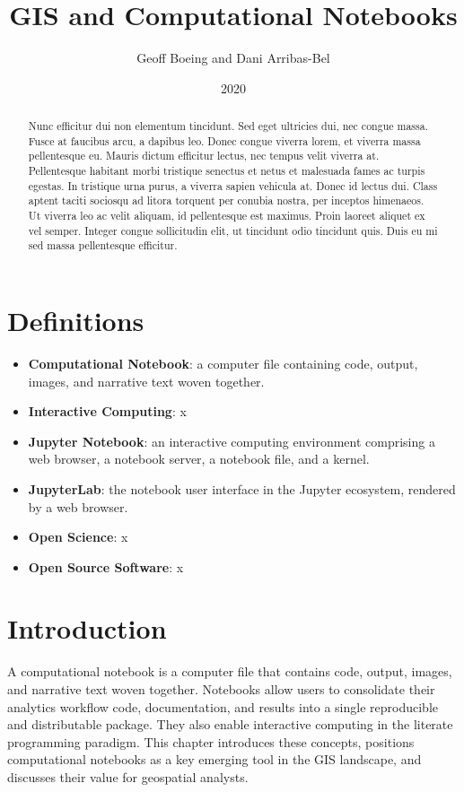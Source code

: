 \documentclass[11pt,letterpaper]{article}
\title{GIS and Computational Notebooks}
\author{Geoff Boeing and Dani Arribas-Bel}
\date{2020}
\begin{document}
\maketitle

\begin{abstract}
Nunc efficitur dui non elementum tincidunt. Sed eget ultricies dui, nec congue massa. Fusce at faucibus arcu, a dapibus leo. Donec congue viverra lorem, et viverra massa pellentesque eu. Mauris dictum efficitur lectus, nec tempus velit viverra at. Pellentesque habitant morbi tristique senectus et netus et malesuada fames ac turpis egestas. In tristique urna purus, a viverra sapien vehicula at. Donec id lectus dui. Class aptent taciti sociosqu ad litora torquent per conubia nostra, per inceptos himenaeos. Ut viverra leo ac velit aliquam, id pellentesque est maximus. Proin laoreet aliquet ex vel semper. Integer congue sollicitudin elit, ut tincidunt odio tincidunt quis. Duis eu mi sed massa pellentesque efficitur.
\end{abstract}

\section*{Definitions}

\begin{itemize}
    \item \textbf{Computational Notebook}: a computer file containing code, output, images, and narrative text woven together.
    \item \textbf{Interactive Computing}: x
    \item \textbf{Jupyter Notebook}: an interactive computing environment comprising a web browser, a notebook server, a notebook file, and a kernel.
    \item \textbf{JupyterLab}: the notebook user interface in the Jupyter ecosystem, rendered by a web browser.
    \item \textbf{Open Science}: x
    \item \textbf{Open Source Software}: x
\end{itemize}

\section{Introduction}

A computational notebook is a computer file that contains code, output, images, and narrative text woven together. Notebooks allow users to consolidate their analytics workflow code, documentation, and results into a single reproducible and distributable package. They also enable interactive computing in the literate programming paradigm. This chapter introduces these concepts, positions computational notebooks as a key emerging tool in the GIS landscape, and discusses their value for geospatial analysts.
\end{document}
